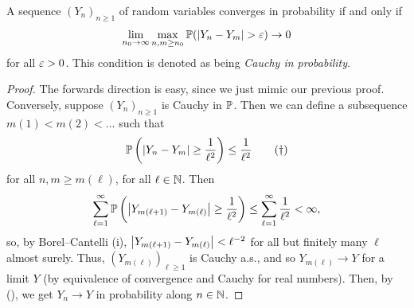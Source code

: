 \begin{lemma}[Panchenko \S2.6] \label{lem:cauchy_in_probability}
    A sequence $(Y_n)_{n \geq 1}$ of random variables converges in probability if and only if
    \[ \lim_{n_0 \to \infty} \max_{n, m \geq n_0} \mathbb P(\left\lvert Y_n - Y_m \right\rvert > \varepsilon) \to 0 \]
    for all $\varepsilon > 0$. This condition is denoted as being \textit{Cauchy in probability}.
\end{lemma}
\begin{proof}
    The forwards direction is easy, since we just mimic our previous proof. Conversely, suppose $(Y_n)_{n \geq 1}$ is Cauchy in $\mathbb P$. Then we can define a subsequence $m(1) < m(2) < \dots$ such that
    \[ \mathbb P\left(\left\lvert Y_n - Y_m \right\rvert \geq \frac{1}{\ell^2}\right) \leq \frac{1}{\ell^2} \tag{\textdagger} \]
    for all $n, m \geq m(\ell)$, for all $\ell \in \mathbb N$. Then
    \[ \sum_{\ell = 1}^\infty \mathbb P\left(\left\lvert Y_{m(\ell + 1)} - Y_{m(\ell)} \right\rvert \geq \frac{1}{\ell^2}\right) \leq \sum_{\ell = 1}^\infty \frac{1}{\ell^2} < \infty, \]
    so, by Borel--Cantelli (i), $\left\lvert Y_{m(\ell + 1)} - Y_{m(\ell)} \right\rvert < \ell^{-2}$ for all but finitely many $\ell$ almost surely. Thus, $(Y_{m(\ell)})_{\ell \geq 1}$ is Cauchy a.s., and so $Y_{m(\ell)} \to Y$ for a limit $Y$ (by equivalence of convergence and Cauchy for real numbers). Then, by (\textdagger), we get $Y_n \to Y$ in probability along $n \in \mathbb N$.
\end{proof}

